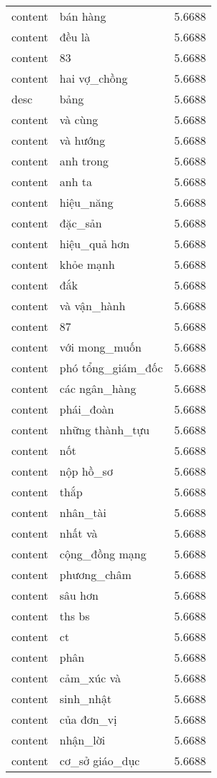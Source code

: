 \documentclass{article}
\begin{document}
\begin{tabular}{lll}
content & bán hàng & 5.6688\\
content & đều là & 5.6688\\
content & 83 & 5.6688\\
content & hai vợ\_chồng & 5.6688\\
desc & bảng & 5.6688\\
content & và cùng & 5.6688\\
content & và hướng & 5.6688\\
content & anh trong & 5.6688\\
content & anh ta & 5.6688\\
content & hiệu\_năng & 5.6688\\
content & đặc\_sản & 5.6688\\
content & hiệu\_quả hơn & 5.6688\\
content & khỏe mạnh & 5.6688\\
content & đắk & 5.6688\\
content & và vận\_hành & 5.6688\\
content & 87 & 5.6688\\
content & với mong\_muốn & 5.6688\\
content & phó tổng\_giám\_đốc & 5.6688\\
content & các ngân\_hàng & 5.6688\\
content & phái\_đoàn & 5.6688\\
content & những thành\_tựu & 5.6688\\
content & nốt & 5.6688\\
content & nộp hồ\_sơ & 5.6688\\
content & thắp & 5.6688\\
content & nhân\_tài & 5.6688\\
content & nhất và & 5.6688\\
content & cộng\_đồng mạng & 5.6688\\
content & phương\_châm & 5.6688\\
content & sâu hơn & 5.6688\\
content & ths bs & 5.6688\\
content & ct & 5.6688\\
content & phân & 5.6688\\
content & cảm\_xúc và & 5.6688\\
content & sinh\_nhật & 5.6688\\
content & của đơn\_vị & 5.6688\\
content & nhận\_lời & 5.6688\\
content & cơ\_sở giáo\_dục & 5.6688\\

\end{tabular}
\end{document}
